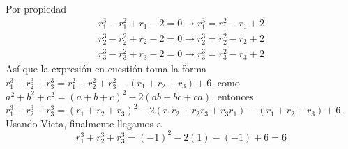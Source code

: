     \begin{solution}
        Por propiedad
        \begin{gather*}
            r_1^3 - r_1^2 + r_1 - 2 = 0 \rightarrow r_1^3 = r_1^2 - r_1 + 2\\
            r_2^3 - r_2^2 + r_2 - 2 = 0 \rightarrow r_2^3 = r_2^2 - r_2 + 2\\
            r_3^3 - r_3^2 + r_3 - 2 = 0 \rightarrow r_3^3 = r_3^2 - r_3 + 2
        \end{gather*}
        Así que la expresión en cuestión toma la forma $r^3_1 + r^3_2 + r^3_3 = r^2_1 + r^2_2 + r^2_3 - (r_1 + r_2 + r_3) + 6$,
        como $a^2 + b^2 + c^2 = (a + b + c)^2 - 2(ab + bc + ca)$, entonces $r^3_1 + r^3_2 + r^3_3 = (r_1 + r_2 + r_3)^2 - 2(r_1 r_2 + r_2 r_3 + r_3 r_1) - (r_1 + r_2 + r_3) + 6$.
        Usando Vieta, finalmente llegamos a
        \[r^3_1 + r^3_2 + r^3_3 = (-1)^2 -2(1) - (-1) + 6 = \boxed{6}\]

    \end{solution}